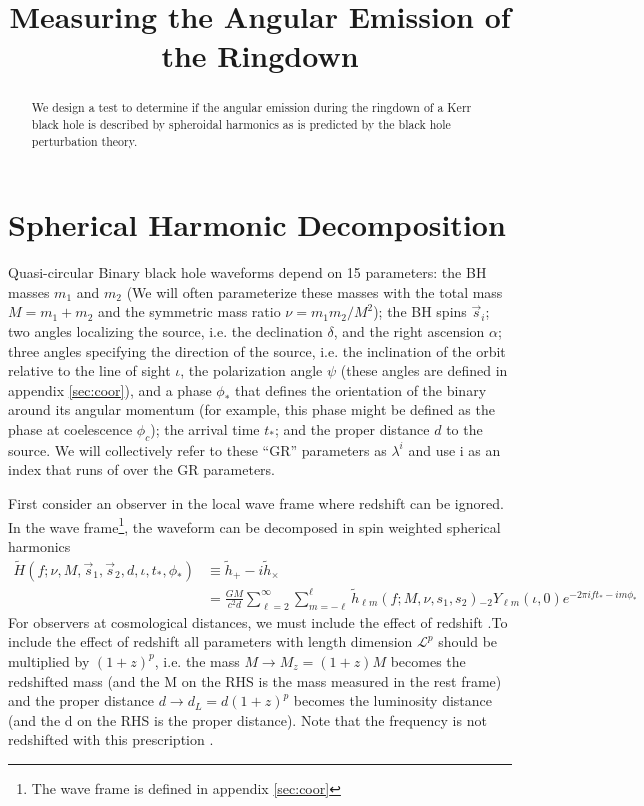 \documentclass[aps,prd,amsmath,showpacs,amssymb,superscriptaddress,nofootinbib,longbibliography,eqsecnum,preprintnumbers]{revtex4-1}
\newcommand{\Ys}{{}_{-2}Y_{\ell m}}
\newcommand{\Caltech}{\affiliation{Theoretical Astrophysics 350-17, California Institute of Technology, Pasadena, CA 91125}}
\begin{document}
\title{Measuring the Angular Emission of the Ringdown}
\begin{abstract}
We design a test to determine if the angular emission during the ringdown of a Kerr black hole is described by spheroidal harmonics as is predicted by the black hole perturbation theory. 
\end{abstract}
\maketitle
\tableofcontents

\section{Spherical Harmonic Decomposition}

Quasi-circular Binary black hole waveforms depend on 15 parameters: the BH masses $m_1$ and $m_2$ (We will often parameterize these masses with the total mass $M=m_1+m_2$ and the symmetric mass ratio $\nu =m_1m_2/M^2$); the BH spins $\vec s_i$; two angles localizing the source, i.e. the declination $\delta$, and the right ascension $\alpha$; three angles specifying the direction of the source, i.e. the inclination of the orbit relative to the line of sight $\iota$, the polarization angle $\psi$ (these angles are defined in appendix \ref{sec:coor}), and a phase $\phi_*$ that defines the orientation of the binary around its angular momentum (for example, this phase might be defined as the phase at coelescence $\phi_c$); the arrival time $t_*$; and the proper distance $d$ to the source. We will collectively refer to these ``GR'' parameters as $\lambda^i$ and use i as an index that runs of over the GR parameters. 

First consider an observer in the local wave frame where redshift can be ignored. In the wave frame\footnote{The wave frame is defined in appendix \ref{sec:coor}}, the waveform can be decomposed in spin weighted spherical harmonics
\begin{align}
\tilde H(f;\nu,M,\vec s_1,\vec s_2, d,\iota,t_*,\phi_*)
&\equiv \tilde h_+-i\tilde h_\times \nonumber \\
&=\frac{GM}{c^2d}\sum_{\ell =2}^\infty \sum_{m=-\ell}^\ell \tilde h_{\ell m}\left(f;M, \nu, s_1,s_2\right)\Ys(\iota, 0)e^{-2\pi i f t_* -im\phi_*} \label{eq:dec}
\end{align}
For observers at cosmological distances, we must include the effect of redshift .To include the effect of redshift all parameters with length dimension $\mathcal{L}^p$ should be multiplied by $(1+z)^p$, i.e. the mass $M\to M_z=(1+z)M$ becomes the redshifted mass (and the M on the RHS is the mass measured in the rest frame) and the proper distance $d\to d_L=d(1+z)^p$ becomes the luminosity distance (and the d on the RHS is the proper distance). Note that the frequency is not redshifted with this prescription \cite{Berti:2005ys,Flanagan:1997sx}.
\end{document}
